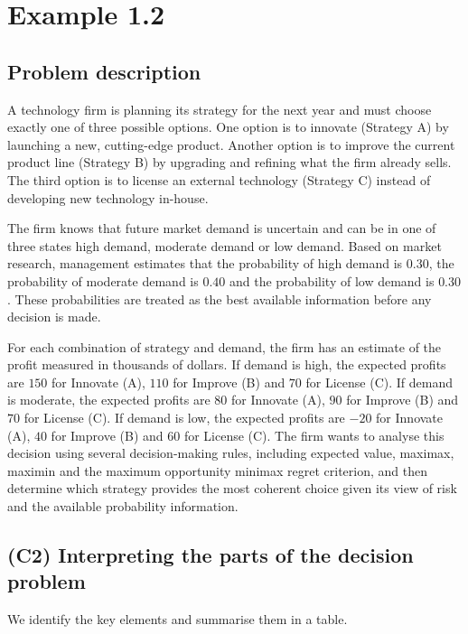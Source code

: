 \section{Example 1.2}\label{example-1-2}
	
	\subsection{Problem description}\label{example-1-problem}
	
	A technology firm is planning its strategy for the next year and must choose exactly one of three possible options.
	One option is to innovate (Strategy A) by launching a new, cutting-edge product. Another option is to improve the current product line
	(Strategy B) by upgrading and refining what the firm already sells. The third option is to license an external technology (Strategy C)
	instead of developing new technology in-house.
	
	The firm knows that future market demand is uncertain and can be in one of three states high demand, moderate demand or low demand.
	Based on market research, management estimates that the probability of high demand is \(0.30\), the probability of moderate demand is \(0.40\)
	and the probability of low demand is \(0.30\). These probabilities are treated as the best available information before any decision is made.
	
	For each combination of strategy and demand, the firm has an estimate of the profit measured in thousands of dollars.
	If demand is high, the expected profits are \(150\) for Innovate (A), \(110\) for Improve (B) and \(70\) for License (C).
	If demand is moderate, the expected profits are \(80\) for Innovate (A), \(90\) for Improve (B) and \(70\) for License (C).
	If demand is low, the expected profits are \(-20\) for Innovate (A), \(40\) for Improve (B) and \(60\) for License (C).
	The firm wants to analyse this decision using several decision-making rules, including expected value, maximax, maximin
	and the maximum opportunity minimax regret criterion, and then determine which strategy provides the most coherent choice
	given its view of risk and the available probability information.
	
	
	\subsection{(C2) Interpreting the parts of the decision problem}\label{example-1-c2}
	
	We identify the key elements and summarise them in a table.
	
